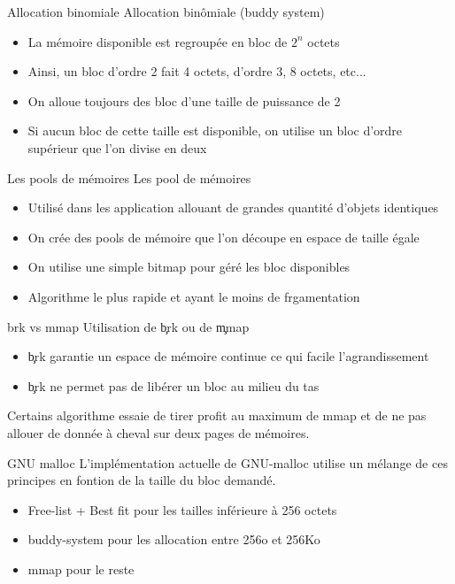 \begin{frame}[fragile=singleslide]{Allocation binomiale}
  Allocation binômiale (buddy system)
  \begin{itemize}
  \item La mémoire disponible est regroupée en bloc de $2^n$ octets
  \item Ainsi, un  bloc d'ordre 2 fait 4 octets,  d'ordre 3, 8 octets,
    etc...
  \item On alloue toujours des bloc d'une taille de puissance de 2
  \item Si  aucun bloc de cette  taille est disponible,  on utilise un
    bloc d'ordre supérieur que l'on divise en deux
  \end{itemize}
\end{frame}

\begin{frame}[fragile=singleslide]{Les pools de mémoires}
  Les pool de mémoires
  \begin{itemize}
  \item  Utilisé dans  les  application allouant  de grandes  quantité
    d'objets identiques
  \item On  crée des pools  de mémoire que  l'on découpe en  espace de
    taille égale
  \item On utilise une simple bitmap pour géré les bloc disponibles
  \item Algorithme le plus rapide et ayant le moins de frgamentation
  \end{itemize}
\end{frame}

\begin{frame}[fragile=singleslide]{brk vs mmap}
  Utilisation de \c{brk} ou de \c{mmap}
  \begin{itemize}
  \item \c{brk} garantie  un espace de mémoire continue  ce qui facile
    l'agrandissement
  \item \c{brk} ne permet pas de libérer un bloc au milieu du tas
  \end{itemize}
  Certains algorithme essaie de tirer  profit au maximum de mmap et de
  ne pas allouer de donnée à cheval sur deux pages de mémoires.
\end{frame}

\begin{frame}[fragile=singleslide]{GNU malloc}
  L'implémentation actuelle de  GNU-malloc utilise un mélange de
  ces principes en fontion de la taille du bloc demandé.
  \begin{itemize}
  \item Free-list + Best fit pour les tailles inférieure à 256 octets
  \item buddy-system pour les allocation entre 256o et 256Ko
  \item mmap pour le reste
  \end{itemize}
\end{frame}

